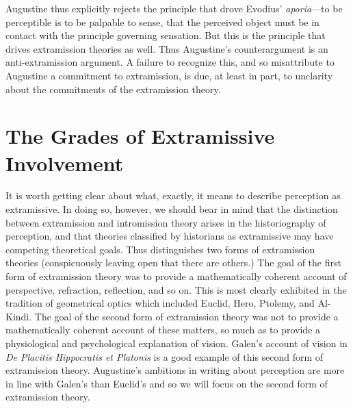 \documentclass[12pt]{article}
\begin{document}
Augustine thus explicitly rejects the principle that drove Evodius' \emph{aporia}---to be perceptible is to be palpable to sense, that the perceived object must be in contact with the principle governing sensation. But this is the principle that drives extramission theories as well. Thus Augustine's counterargument is an anti-extramis\-sion argument. A failure to recognize this, and so misattribute to Augustine a commitment to extramission, is due, at least in part, to unclarity about the commitments of the extramission theory.


\section{The Grades of Extramissive Involvement} %
\label{sec:extramission}

It is worth getting clear about what, exactly, it means to describe perception as extramissive. In doing so, however, we should bear in mind that the distinction between extramission and intromission theory arises in the historiography of perception, and that theories classified by historians as extramissive may have competing theoretical goals. Thus \citet{Lindberg:1978lq} distinguishes two forms of extramission theories (conspicuously leaving open that there are others.) The goal of the first form of extramission theory was to provide a mathematically coherent account of perspective, refraction, reflection, and so on. This is most clearly exhibited in the tradition of geometrical optics which included Euclid, Hero, Ptolemy, and Al-Kindi. The goal of the second form of extramission theory was not to provide a mathematically coherent account of these matters, so much as to provide a physiological and psychological explanation of vision. Galen's account of vision in \emph{De Placitis Hippocratis et Platonis} is a good example of this second form of extramission theory. Augustine's ambitions in writing about perception are more in line with Galen's than Euclid's and so we will focus on the second form of extramission theory. 
\end{document}
